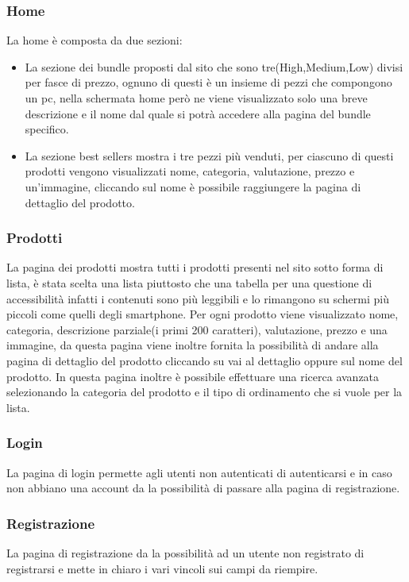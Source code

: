 \subsubsection{Home}
La home è composta da due sezioni:
\begin{itemize}
	\item La sezione dei bundle proposti dal sito che sono tre(High,Medium,Low) divisi per fasce di prezzo, ognuno di questi è un insieme di pezzi che compongono un pc, nella schermata home però ne viene visualizzato solo una breve descrizione e il nome dal quale si potrà accedere alla pagina del bundle specifico.
	\item La sezione best sellers mostra i tre pezzi più venduti, per ciascuno di questi prodotti vengono visualizzati nome, categoria, valutazione, prezzo e un'immagine, cliccando sul nome è possibile raggiungere la pagina di dettaglio del prodotto.
\end{itemize}

\subsubsection{Prodotti}
La pagina dei prodotti mostra tutti i prodotti presenti nel sito sotto forma di lista, è stata scelta una lista piuttosto che una tabella per una questione di accessibilità infatti i contenuti sono più leggibili e lo rimangono su schermi più piccoli come quelli degli smartphone.\newline
Per ogni prodotto viene visualizzato nome, categoria, descrizione parziale(i primi 200 caratteri), valutazione, prezzo e una immagine, da questa pagina viene inoltre fornita la possibilità di andare alla pagina di dettaglio del prodotto cliccando su vai al dettaglio oppure sul nome del prodotto.\newline
In questa pagina inoltre è possibile effettuare una ricerca avanzata selezionando la categoria del prodotto e il tipo di ordinamento che si vuole per la lista.

\subsubsection{Login}
La pagina di login permette agli utenti non autenticati di autenticarsi e in caso non abbiano una account da la possibilità di passare alla pagina di registrazione.

\subsubsection{Registrazione}
La pagina di registrazione da la possibilità ad un utente non registrato di registrarsi e mette in chiaro i vari vincoli sui campi da riempire.

